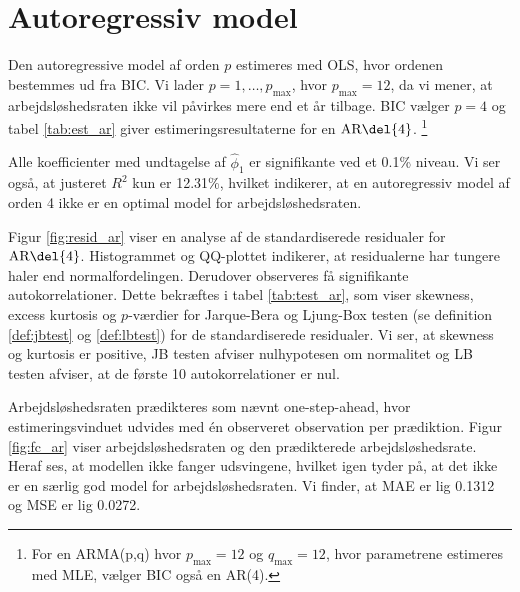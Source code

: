 \section{Autoregressiv model}
Den autoregressive model af orden \(p\) estimeres med OLS, hvor ordenen bestemmes ud fra BIC.
Vi lader $p = 1, \ldots, p_{\max}$, hvor \(p_\text{max}=12\), da vi mener, at arbejdsløshedsraten ikke vil påvirkes mere end et år tilbage.
BIC vælger \(p=4\) og tabel \ref{tab:est_ar} giver estimeringsresultaterne for en \(\text{AR} \del{4}\). \footnote{For en ARMA(p,q) hvor $p_{\max} = 12$ og $q_{\max} = 12$, hvor parametrene estimeres med MLE, vælger BIC også en AR(4).}
%


Alle koefficienter med undtagelse af $\widehat\phi_1$ er signifikante ved et 0.1\% niveau. 
Vi ser også, at justeret $R^2$ kun er 12.31\%, hvilket indikerer, at en autoregressiv model af orden 4 ikke er en optimal model for arbejdsløshedsraten. 



Figur \ref{fig:resid_ar} viser en analyse af de standardiserede residualer for \(\text{AR} \del{4}\). 
Histogrammet og QQ-plottet indikerer, at residualerne har tungere haler end normalfordelingen. 
Derudover observeres få signifikante autokorrelationer.
Dette bekræftes i tabel \ref{tab:test_ar}, som viser skewness, excess kurtosis og \(p\)-værdier for Jarque-Bera og Ljung-Box testen (se definition \ref{def:jbtest} og \ref{def:lbtest}) for de standardiserede residualer. 
Vi ser, at skewness og kurtosis er positive, JB testen afviser nulhypotesen om normalitet og LB testen afviser, at de første 10 autokorrelationer er nul.

Arbejdsløshedsraten prædikteres som nævnt one-step-ahead, hvor estimeringsvinduet udvides med én observeret observation per prædiktion.
Figur \ref{fig:fc_ar} viser arbejdsløshedsraten og den prædikterede arbejdsløshedsrate. 
Heraf ses, at modellen ikke fanger udsvingene, hvilket igen tyder på, at det ikke er en særlig god model for arbejdsløshedsraten. 
Vi finder, at MAE er lig 0.1312 og MSE er lig 0.0272.
%

\newpage